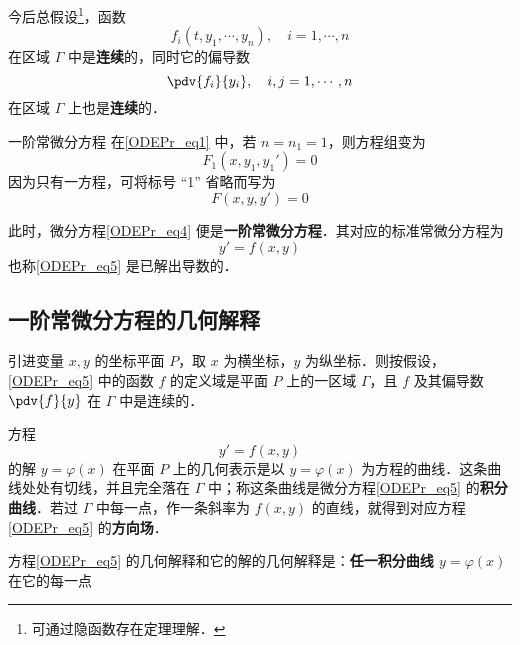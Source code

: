 今后总假设\footnote{可通过隐函数存在定理理解．}，函数 
\begin{equation}
f_i(t,y_1,\cdots,y_n),\quad i=1,\cdots,n
\end{equation}
在区域 $\Gamma$ 中是\textbf{连续}的，同时它的偏导数
\begin{equation}
\pdv{f_i}{y_i},\quad i,j=1,\cdots,n
\end{equation}
在区域 $\Gamma$ 上也是\textbf{连续}的．
\begin{example}{一阶常微分方程}
在\autoref{ODEPr_eq1} 中，若 $n=n_1=1$，则方程组变为
\begin{equation}\label{ODEPr_eq3}
F_1(x,y_1,y_1')=0
\end{equation}
因为只有一方程，可将标号 “1” 省略而写为
\begin{equation}\label{ODEPr_eq4}
F(x,y,y')=0
\end{equation}

此时，微分方程\autoref{ODEPr_eq4} 便是\textbf{一阶常微分方程}．其对应的标准常微分方程为
\begin{equation}\label{ODEPr_eq5}
y'=f(x,y)
\end{equation}
也称\autoref{ODEPr_eq5} 是已解出导数的．
\end{example}
\subsection{一阶常微分方程的几何解释}
引进变量 $x,y$ 的坐标平面 $P$，取 $x$ 为横坐标，$y$ 为纵坐标．则按假设，\autoref{ODEPr_eq5} 中的函数 $f$ 的定义域是平面 $P$ 上的一区域 $\Gamma$，且 $f$ 及其偏导数 $\pdv{f}{y}$ 在 $\Gamma$ 中是连续的．

方程
\begin{equation}
y'=f(x,y)
\end{equation}
的解 $y=\varphi(x)$ 在平面 $P$ 上的几何表示是以 $y=\varphi(x)$ 为方程的曲线．这条曲线处处有切线，并且完全落在 $\Gamma$ 中；称这条曲线是微分方程\autoref{ODEPr_eq5} 的\textbf{积分曲线}．若过 $\Gamma$ 中每一点，作一条斜率为 $f(x,y)$ 的直线，就得到对应方程\autoref{ODEPr_eq5} 的\textbf{方向场}．

方程\autoref{ODEPr_eq5} 的几何解释和它的解的几何解释是：\textbf{任一积分曲线 $y=\varphi(x)$} 在它的每一点